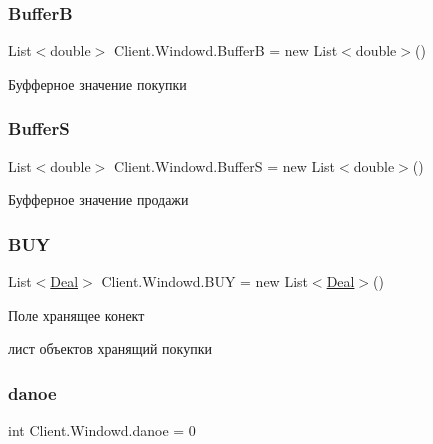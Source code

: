 \subsubsection{\texorpdfstring{BufferB}{BufferB}}
{\footnotesize\ttfamily List$<$double$>$ Client.\+Windowd.\+BufferB = new List$<$double$>$()}



Буфферное значение покупки 

\hypertarget{class_client_1_1_windowd_a923a51f80de2de0db93114454f23e6cb}{}\label{class_client_1_1_windowd_a923a51f80de2de0db93114454f23e6cb} 
\subsubsection{\texorpdfstring{BufferS}{BufferS}}
{\footnotesize\ttfamily List$<$double$>$ Client.\+Windowd.\+BufferS = new List$<$double$>$()}



Буфферное значение продажи 

\hypertarget{class_client_1_1_windowd_aec1343722b0bde8b263e8258fc8f806c}{}\label{class_client_1_1_windowd_aec1343722b0bde8b263e8258fc8f806c} 
\subsubsection{\texorpdfstring{B\+UY}{BUY}}
{\footnotesize\ttfamily List$<$\hyperlink{class_client_1_1_deal}{Deal}$>$ Client.\+Windowd.\+B\+UY = new List$<$\hyperlink{class_client_1_1_deal}{Deal}$>$()}



Поле хранящее конект 

лист объектов хранящий покупки \hypertarget{class_client_1_1_windowd_a960143b9372a3a7dc576b4578aa40bd8}{}\label{class_client_1_1_windowd_a960143b9372a3a7dc576b4578aa40bd8} 
\subsubsection{\texorpdfstring{danoe}{danoe}}
{\footnotesize\ttfamily int Client.\+Windowd.\+danoe = 0}



